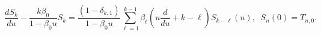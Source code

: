 \begin{equation}%
\frac{dS_k}{du} - \frac{k\beta_0}{1-\beta_0 u} S_k = \frac{(1-
\delta_{k,1})}{1-\beta_0 u} \sum_{\ell = 1}^{k-1} \beta_\ell \left( u
\frac{d}{du} + k - \ell \right) S_{k-\ell} (u), \; \; S_n(0)=T_{n,0}.
\end{equation}

